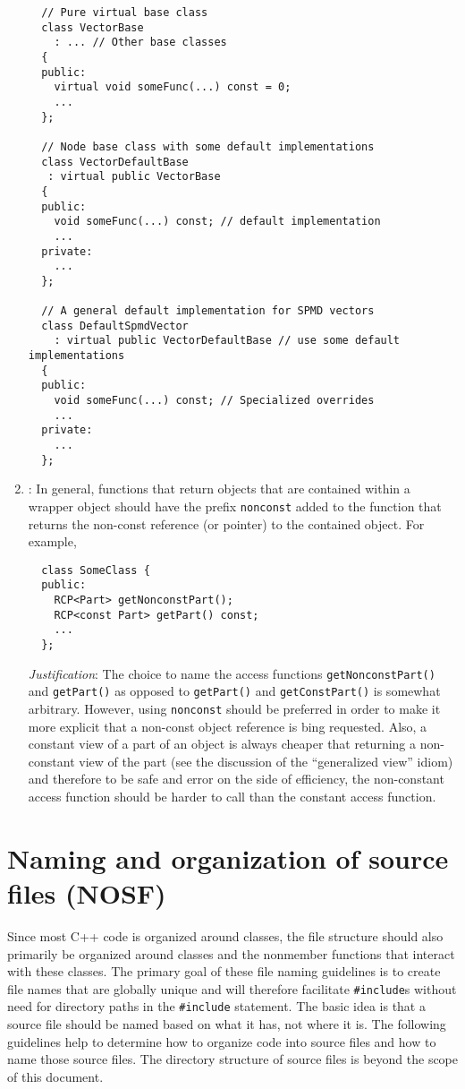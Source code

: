 \begin{enumerate}
{\small\begin{verbatim}
  // Pure virtual base class 
  class VectorBase
    : ... // Other base classes
  {
  public:
    virtual void someFunc(...) const = 0;
    ...
  };

  // Node base class with some default implementations
  class VectorDefaultBase
   : virtual public VectorBase
  {
  public:
    void someFunc(...) const; // default implementation
    ...
  private:
    ...
  };

  // A general default implementation for SPMD vectors
  class DefaultSpmdVector
    : virtual public VectorDefaultBase // use some default implementations
  {
  public:
    void someFunc(...) const; // Specialized overrides
    ...
  private:
    ...
  };
\end{verbatim}}

{}\item\NCConstNonconstAccessFunctionName: In general, functions that return
objects that are contained within a wrapper object should have the prefix
{}\texttt{nonconst} added to the function that returns the non-const reference
(or pointer) to the contained object.  For example,

{\small\begin{verbatim}
  class SomeClass {
  public:
    RCP<Part> getNonconstPart();
    RCP<const Part> getPart() const;
    ...
  };
\end{verbatim}}

{}\textit{Justification}: The choice to name the access functions
{}\texttt{getNonconstPart()} and {}\texttt{getPart()} as opposed to
{}\texttt{getPart()} and {}\texttt{getConstPart()} is somewhat arbitrary.
However, using {}\texttt{nonconst} should be preferred in order to make it
more explicit that a non-const object reference is bing requested.  Also, a
constant view of a part of an object is always cheaper that returning a
non-constant view of the part (see the discussion of the ``generalized view''
idiom) and therefore to be safe and error on the side of efficiency, the
non-constant access function should be harder to call than the constant access
function.

\end{enumerate}

%
\section{Naming and organization of source files (NOSF)}
%

Since most C++ code is organized around classes, the file structure should
also primarily be organized around classes and the nonmember functions that
interact with these classes.  The primary goal of these file naming guidelines
is to create file names that are globally unique and will therefore facilitate
{}\texttt{\#include}s without need for directory paths in the
{}\texttt{\#include} statement.  The basic idea is that a source file should
be named based on what it has, not where it is.  The following guidelines help
to determine how to organize code into source files and how to name those
source files.  The directory structure of source files is beyond the scope of
this document.

